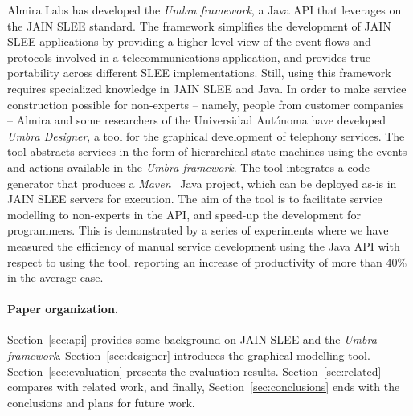 Almira Labs has developed the {\em Umbra framework}, a Java API that leverages 
on the JAIN SLEE standard. The framework simplifies the development of JAIN SLEE applications by providing 
a higher-level view of the event flows and protocols involved in a telecommunications application, and provides 
true portability across different SLEE implementations. 
Still, using this framework requires specialized knowledge in JAIN SLEE and Java. In order to make service 
construction possible for non-experts -- namely, people from customer companies -- Almira and some 
researchers of the Universidad Aut\'onoma have developed {\em Umbra Designer}, a tool for the graphical
development of telephony services. The tool abstracts services in the form of hierarchical state machines using the 
events and actions available in the {\em Umbra framework}. 
The tool integrates a code generator that produces a {\em Maven}~\cite{Maven} Java project, which 
can be deployed as-is in JAIN SLEE servers for execution. The aim of the tool is to facilitate 
service modelling to non-experts in the API, and speed-up the development for programmers. This is 
demonstrated by a series of experiments where we have measured the efficiency of manual service 
development using the Java API with respect to using the tool, reporting an increase of productivity of 
more than 40\% in the average case.

\paragraph{Paper organization.} Section~\ref{sec:api} provides some background on 
JAIN SLEE and the {\em Umbra framework}. Section~\ref{sec:designer} introduces the graphical 
modelling tool. Section~\ref{sec:evaluation} presents the evaluation results. Section~\ref{sec:related} 
compares with related work, and finally, Section~\ref{sec:conclusions} ends with the conclusions and plans 
for future work.
